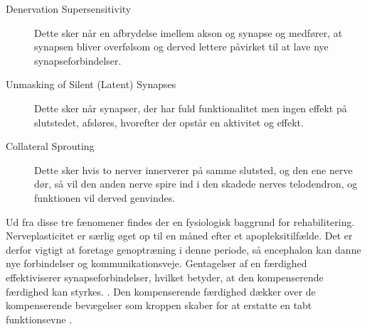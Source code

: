 \begin{description}
	\item[Denervation Supersensitivity] Dette sker når en afbrydelse imellem akson og synapse og medfører, at synapsen bliver overfølsom og derved lettere påvirket til at lave nye synapseforbindelser.
	\item [Unmasking of Silent (Latent) Synapses] Dette sker når synapser, der har fuld funktionalitet men ingen effekt på slutstedet, afsløres, hvorefter der opstår en aktivitet og effekt. 
	\item[Collateral Sprouting] Dette sker hvis to nerver innerverer på samme slutsted, og den ene nerve dør, så vil den anden nerve spire ind i den skadede nerves telodendron, og funktionen vil derved genvindes.
\end{description}

Ud fra disse tre fænomener findes der en fysiologisk baggrund for rehabilitering. Nerveplasticitet er særlig øget op til en måned efter et apopleksitilfælde. Det er derfor vigtigt at foretage genoptræning i denne periode, så encephalon kan danne nye forbindelser og kommunikationsveje. \cite{Rugnett2015} Gentagelser af en færdighed effektiviserer synapseforbindelser, hvilket betyder, at den kompenserende færdighed kan styrkes. \cite{Stanfield2014}. Den kompenserende færdighed dækker over de kompenserende bevægelser som kroppen skaber for at erstatte en tabt funktionsevne \cite{Takeuchi2012,Leea2009}. %


